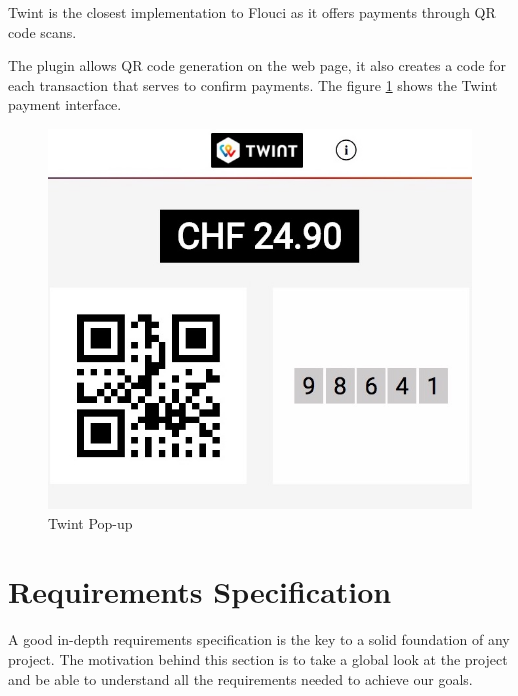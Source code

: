 \begin{spacing}{1.2}
\begin{itemize}
Twint \cite{twint} is the closest implementation to Flouci as it offers payments through QR code scans.

The plugin allows QR code generation on the web page, it also creates a code for each transaction that serves to confirm payments.
The figure \ref{fig:twint} shows the Twint payment interface.
\begin{figure}[!ht]\centering
\includegraphics[scale=0.4]{twint.jpg}
\caption{Twint Pop-up}
\label{fig:twint}
\end{figure}
  \end{itemize}



\section{Requirements Specification}
A good in-depth requirements specification is the key to a solid foundation of any project.
The motivation behind this section is to take a global look at the project and be able to understand all the requirements needed to achieve our goals.

\end{spacing}

